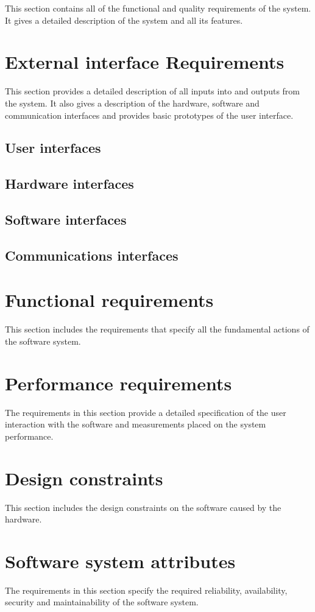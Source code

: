 \documentclass[../main.tex]{subfiles}
\begin{document}
	This section contains all of the functional and quality requirements of the system. It gives a detailed description of the system and all its features.
	\section{External interface Requirements}
		This section provides a detailed description of all inputs into and outputs from the system. It also gives a description of the hardware, software and communication interfaces and provides basic prototypes of the user interface.
	\subsection{User interfaces}
	\subsection{Hardware interfaces}
	\subsection{Software interfaces}
	\subsection{Communications interfaces}
	\section{Functional requirements}
		 This section includes the requirements that specify all the fundamental actions of the software system.
	\section{Performance requirements}
		The requirements in this section provide a detailed specification of the user interaction with the software and measurements placed on the system performance.
	\section{Design constraints}
		This section includes the design constraints on the software caused by the hardware.
	\section{Software system attributes}
		The requirements in this section specify the required reliability, availability, security and maintainability of the software system. 
\end{document}
